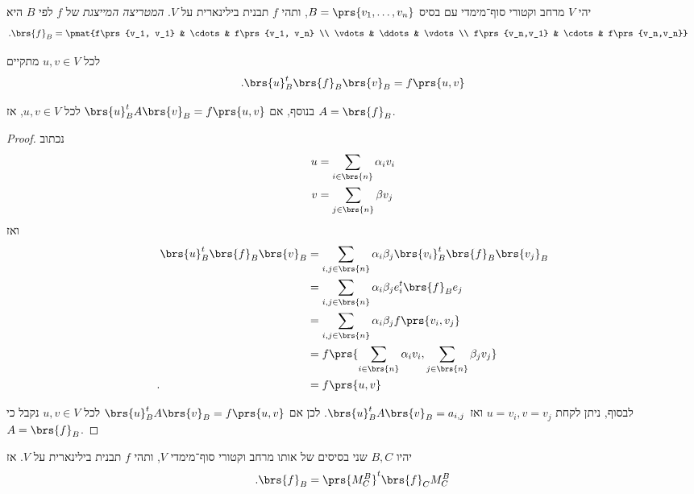 \documentclass[a4paper,10pt,twoside,openany]{book}
\begin{document}
\begin{definition}
יהי
$V$
מרחב וקטורי סוף־מימדי עם בסיס
$B = \prs{v_1, \ldots, v_n}$,
ותהי
$f$
תבנית בילינארית על
$V$.
\emph{המטריצה המייצגת}
של
$f$
לפי
$B$
היא
\begin{align*}
\text{.} \brs{f}_B &= \pmat{f\prs{v_1, v_1} & \cdots & f\prs{v_1, v_n} \\ \vdots & \ddots & \vdots \\ f\prs{v_n,v_1} & \cdots & f\prs{v_n,v_n}}
\end{align*}
\end{definition}

\begin{proposition}
לכל
$u,v \in V$
מתקיים
\[\text{.} \brs{u}_B^t \brs{f}_B \brs{v}_B = f\prs{u,v}\]

בנוסף, אם
$\brs{u}_B^t A \brs{v}_B = f\prs{u,v}$
לכל
$u,v \in V$,
אז
$A = \brs{f}_B$.
\end{proposition}

\begin{proof}
נכתוב
\begin{align*}
u &= \sum_{i \in \brs{n}} \alpha_i v_i \\
v &= \sum_{j \in \brs{n}} \beta v_j
\end{align*}
ואז
\begin{align*}
\brs{u}_B^t \brs{f}_B \brs{v}_B &= \sum_{i,j \in \brs{n}} \alpha_i \beta_j \brs{v_i}_B^t \brs{f}_B \brs{v_j}_B
\\&= \sum_{i,j \in \brs{n}} \alpha_i \beta_j e_i^t \brs{f}_B e_j
\\&= \sum_{i,j \in \brs{n}} \alpha_i \beta_j f\prs{v_i, v_j}
\\&= f\prs{\sum_{i \in \brs{n}} \alpha_i v_i, \sum_{j \in \brs{n}} \beta_j v_j}
\\ \text{.} \hphantom{\brs{u}_B^t \brs{f}_B \brs{v}_B} &= f\prs{u,v}
\end{align*}

לבסוף, ניתן לקחת
$u = v_i, v = v_j$
ואז
$\brs{u}_B^t A \brs{v}_B = a_{i,j}$.
לכן אם
$\brs{u}_B^t A \brs{v}_B = f\prs{u,v}$
לכל
$u,v \in V$
נקבל כי
$A = \brs{f}_B$.
\end{proof}

\begin{corollary}
יהיו
$B,C$
שני בסיסים של אותו מרחב וקטורי סוף־מימדי
$V$,
ותהי
$f$
תבנית בילינארית על
$V$.
אז
\begin{align*}
\text{.} \brs{f}_B = \prs{M^B_C}^t \brs{f}_C M^B_C
\end{align*}
\end{corollary}
\end{document}
